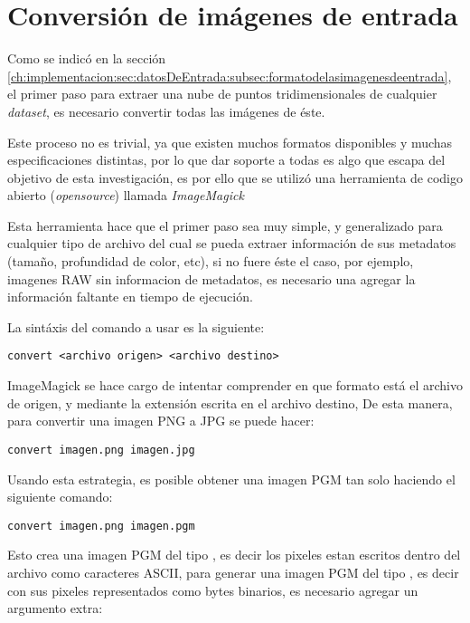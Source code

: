 \section{Conversión de imágenes de entrada}
\label{ch:implementacion:sec:conversiondeimagenesdeentrada}

Como se indicó en la sección \ref{ch:implementacion:sec:datosDeEntrada:subsec:formatodelasimagenesdeentrada}, el primer paso para extraer una nube de puntos tridimensionales de cualquier \emph{dataset}, es necesario convertir todas las imágenes de éste.

Este proceso no es trivial, ya que existen muchos formatos disponibles y muchas especificaciones distintas, por lo que dar soporte a todas es algo que escapa del objetivo de esta investigación, es por ello que se utilizó una herramienta de codigo abierto (\emph{opensource}) llamada \emph{ImageMagick}

Esta herramienta hace que el primer paso sea muy simple, y generalizado para cualquier tipo de archivo del cual se pueda extraer información de sus metadatos (tamaño, profundidad de color, etc), si no fuere éste el caso, por ejemplo, imagenes RAW sin informacion de metadatos, es necesario una agregar la información faltante en tiempo de ejecución.

La sintáxis del comando a usar es la siguiente:

\begin{verbatim}
convert <archivo origen> <archivo destino>
\end{verbatim}

ImageMagick se hace cargo de intentar comprender en que formato está el archivo de origen, y mediante la extensión escrita en el archivo destino, De esta manera, para convertir una imagen PNG a JPG se puede hacer:

\begin{verbatim}
convert imagen.png imagen.jpg
\end{verbatim}

Usando esta estrategia, es posible obtener una imagen PGM tan solo haciendo el siguiente comando:

\begin{verbatim}
convert imagen.png imagen.pgm
\end{verbatim}

Esto crea una imagen PGM del tipo , es decir los pixeles estan escritos dentro del archivo como caracteres ASCII, para generar una imagen PGM del tipo , es decir con sus pixeles representados como bytes binarios, es necesario agregar un argumento extra:

